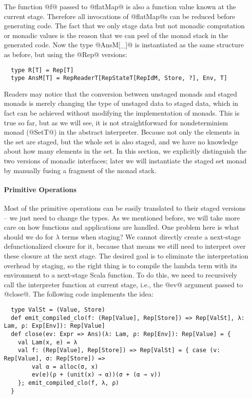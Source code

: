 The function @f@ passed to @flatMap@ is also a function value known at the current stage.
Therefore all invocations of @flatMap@s can be reduced before generating code.
The fact that we only stage data but not monadic computation or monadic
values is the reason that we can peel of the monad stack in the generated code.
Now the type @AnsM[_]@ is instantiated as the same structure as before, but using the
@Rep@ versions:
\begin{lstlisting}
  type R[T] = Rep[T]
  type AnsM[T] = RepReaderT[RepStateT[RepIdM, Store, ?], Env, T]
\end{lstlisting}

Readers may notice that the conversion between unstaged monads and staged monads
is merely changing the type of unstaged data to staged data, which in fact can
be achieved without modifying the implementation of monads. This is true so far,
but as we will see, it is not straightforward for nondeterminism monad
(@SetT@) in the abstract interpreter. Because not only the elements in the set are
staged, but the whole set is also staged, and we have no knowledge about how
many elements in the set. In this section, we explicitly distinguish the two
versions of monadic interfaces; later we will instantiate the staged set monad
by manually fusing a fragment of the monad stack.

\paragraph{Primitive Operations} Most of the primitive operations can be easily
translated to their staged versions -- we just need to change the types.
As we mentioned before, we will take more care on how functions and
applications are handled.  One problem here is what should we do for
$\lambda$ terms when staging? We cannot directly create a next-stage
defunctionalized closure for it, because that means we still need to
interpret over these closure at the next stage.  The desired goal is to
eliminate the interpretation overhead by staging, so the right thing is to
compile the lambda term with its environment to a next-stage Scala function. To
do this, we need to recursively call the interpreter function at current stage,
i.e., the @ev@ argument passed to @close@.  The following code implements the
idea:
\begin{lstlisting}
  type ValSt = (Value, Store)
  def emit_compiled_clo(f: (Rep[Value], Rep[Store]) => Rep[ValSt], λ: Lam, ρ: Exp[Env]): Rep[Value]
  def close(ev: Expr => Ans)(λ: Lam, ρ: Rep[Env]): Rep[Value] = {
    val Lam(x, e) = λ
    val f: (Rep[Value], Rep[Store]) => Rep[ValSt] = { case (v: Rep[Value], σ: Rep[Store]) =>
        val α = alloc(σ, x)
        ev(e)(ρ + (unit(x) → α))(σ + (α → v))
    }; emit_compiled_clo(f, λ, ρ)
  }
\end{lstlisting}

